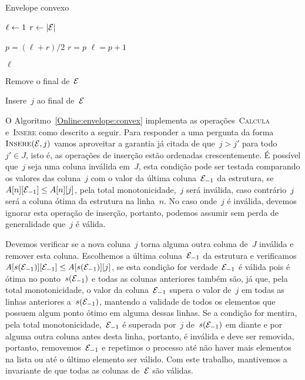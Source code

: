 \begin{algorithm}[h]
\caption{Envelope convexo}
\label{Online:envelope:convex}
\begin{algorithmic}[1]
    \State $\ell \leftarrow 1$
    \State $r \leftarrow |\mathcal{E}|$
    
        \State $p = (\ell+r)/2$
            \State $r = p$
        \Else
            \State $\ell = p+1$
        \EndIf
    \EndWhile

    \State \Return $\ell$
\EndFunction

        \State \Return
    \EndIf
    
        \State Remove o final de~$\mathcal{E}$
    \EndWhile

    \State Insere~$j$ ao final de~$\mathcal{E}$
\EndFunction
\end{algorithmic}
\end{algorithm}

O Algoritmo~\ref{Online:envelope:convex} implementa as operações~\textsc{Calcula} e~\textsc{Insere} como descrito a seguir. Para responder a uma pergunta da forma~$\textsc{Insere}(\mathcal{E},j)$ vamos aproveitar a garantia já citada de que~$j > j'$ para todo~$j' \in J$, isto é, as operações de inserção estão ordenadas crescentemente. É possível que~$j$ seja uma coluna inválida em~$J$, esta condição pode ser testada comparando os valores das coluna~$j$ com o valor da última coluna~$\mathcal{E}_{-1}$ da estrutura, se~${A[n][\mathcal{E}_{-1}] \leq A[n][j]}$, pela total monotonicidade,~$j$ será inválida, caso contrário~$j$ será a coluna ótima da estrutura na linha~$n$. No caso onde~$j$ é inválida, devemos ignorar esta operação de inserção, portanto, podemos assumir sem perda de generalidade que~$j$ é válida.

Devemos verificar se a nova coluna~$j$ torna alguma outra coluna de~$J$ inválida e remover esta coluna. Escolhemos a última coluna~$\mathcal{E}_{-1}$ da estrutura e verificamos~${A[s(\mathcal{E}_{-1})][\mathcal{E}_{-1}] \leq A[s(\mathcal{E}_{-1})][j]}$, se esta condição for verdade~$\mathcal{E}_{-1}$ é válida pois é ótima no ponto~$s(\mathcal{E}_{-1})$ e todas as colunas anteriores também são, já que, pela total monotonicidade, o valor da coluna~$\mathcal{E}_{-1}$ supera o valor de~$j$ em todas as linhas anteriores a~$s(\mathcal{E}_{-1})$, mantendo a validade de todos os elementos que possuem algum ponto ótimo em alguma dessas linhas. Se a condição for mentira, pela total monotonicidade,~$\mathcal{E}_{-1}$ é superada por~$j$ de~$s(\mathcal{E}_{-1})$ em diante e por alguma outra coluna antes desta linha, portanto, é inválida e deve ser removida, portanto, removemos~$\mathcal{E}_{-1}$ e repetimos o processo até não haver mais elementos na lista ou até o último elemento ser válido. Com este trabalho, mantivemos a invariante de que todas as colunas de~$\mathcal{E}$ são válidas.

